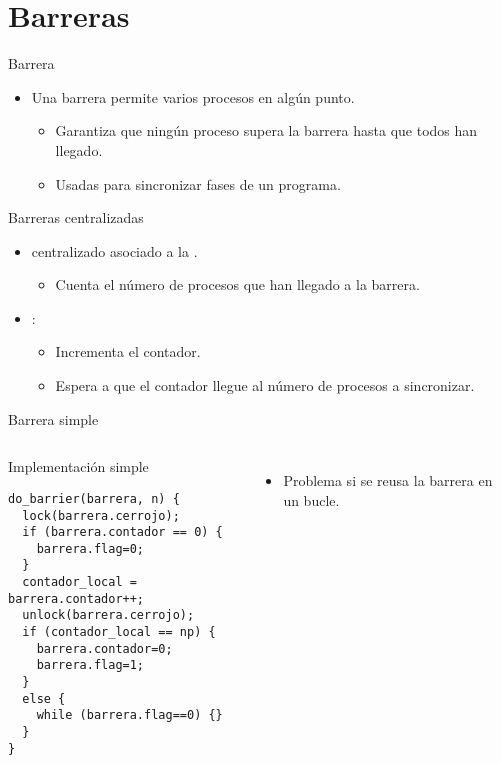 \section{Barreras}

\begin{frame}[t]{Barrera}
\begin{itemize}
  \item Una barrera permite  varios procesos en algún punto.
  
    \begin{itemize}
      \item Garantiza que ningún proceso supera la barrera hasta que todos han llegado.
      \item Usadas para sincronizar fases de un programa.
    \end{itemize}
\end{itemize}
\end{frame}

\begin{frame}[t]{Barreras centralizadas}
\begin{itemize}
  \item {} centralizado asociado a la .
    \begin{itemize}
      \item Cuenta el número de procesos que han llegado a la barrera.
    \end{itemize}

  \item {}:
    \begin{itemize}
      \item Incrementa el contador.
      \item Espera a que el contador llegue al número de procesos a sincronizar.
    \end{itemize}
\end{itemize}
\end{frame}

\begin{frame}[t,fragile]{Barrera simple}
\begin{columns}

\begin{block}{Implementación simple}
\begin{lstlisting}
do_barrier(barrera, n) {
  lock(barrera.cerrojo);
  if (barrera.contador == 0) {
    barrera.flag=0;
  }
  contador_local = barrera.contador++;
  unlock(barrera.cerrojo);
  if (contador_local == np) {
    barrera.contador=0;
    barrera.flag=1;
  }
  else {
    while (barrera.flag==0) {}
  }
}
\end{lstlisting}
\end{block}

\begin{itemize}
  \item Problema si se reusa la barrera en un bucle.
\end{itemize}

\end{columns}
\end{frame}


